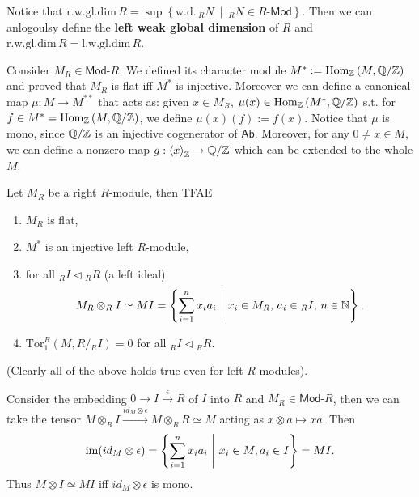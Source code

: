 \begin{rem}[]
	Notice that $\mathrm{r.w.gl.dim}\, R = \sup \left\{ \mathrm{w.d.}\, {}_RN \ \middle|\ {}_RN \in R\text{-}\mathsf{Mod} \right\}$.
	Then we can anlogoulsy define the \textbf{left weak global dimension} of $R$
	and $\mathrm{r.w.gl.dim}\, R = \mathrm{l.w.gl.dim}\, R$.
\end{rem}

\begin{rem}[]
	Consider $M_R \in \mathsf{Mod}\text{-}R$.
	We defined its character module $M^* := \mathrm{Hom}_{\mathbb{Z}}\left( M, \mathbb{Q}/\mathbb{Z} \right)$
	and proved that $M_R$ is flat iff $M^*$ is injective.
	Moreover we can define a canonical map $\mu: M \to M^{**}$ that
	acts as: given $x \in M_R$, $\mu(x) \in \mathrm{Hom}_{ \mathbb{Z}}\left( M^*, \mathbb{Q}/\mathbb{Z} \right)$
	s.t. for $f \in M^* = \mathrm{Hom}_{\mathbb{Z}}\left( M, \mathbb{Q}/\mathbb{Z} \right)$,
	we define $\mu(x) (f) := f(x)$.
	Notice that $\mu$ is mono, since $\mathbb{Q}/\mathbb{Z}$ is an injective cogenerator of $\mathsf{Ab}$.
	Moreover, for any $0 \neq x \in M$, we can define a nonzero map
	$g: \left\langle x \right\rangle_{\mathbb{Z}} \to \mathbb{Q}/\mathbb{Z}$
	which can be extended to the whole $M$.
\end{rem}

\begin{prop}
	Let $M_R$ be a right $R$-module, then TFAE
	\begin{enumerate}
		\item $M_R$ is flat,
		\item $M^*$ is an injective left $R$-module,
		\item for all ${}_RI \triangleleft {}_RR$ (a left ideal)
			\begin{equation}
			M_R \otimes_R I \simeq MI =
			\left\{ \sum_{i=1}^{n} x_i a_i \ \middle|\ x_i \in M_R,\, a_i \in {}_RI,\, n \in \mathbb{N} \right\}
			,\end{equation} 
		\item $\mathrm{Tor}^R_1(M, R/{}_RI) = 0$ for all ${}_RI \triangleleft {}_RR$.
	\end{enumerate}
	(Clearly all of the above holds true even for left $R$-modules).
\end{prop} 

\begin{rem}[]
	Consider the embedding $0 \to I \xrightarrow{\epsilon} R$ of $I$ into $R$ and $M_R \in \mathsf{Mod}\text{-}R$,
	then we can take the tensor
	$M \otimes_R I \xrightarrow{id_M \otimes \epsilon} M \otimes_R R \simeq M$ acting as
	$x \otimes a \mapsto xa$.
	Then
	\begin{equation}
		\operatorname{im} (id_M \otimes \epsilon) = \left\{ \sum_{i=1}^{n} x_ia_i \ \middle|\ x_i \in M, a_i \in I \right\} =
		MI
	.\end{equation} 
	Thus $M \otimes I \simeq MI$ iff $id_M \otimes \epsilon$ is mono.
\end{rem}

